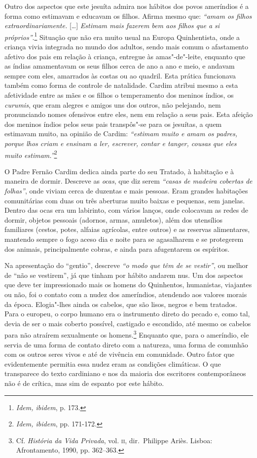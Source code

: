 Outro dos aspectos que este jesuíta admira nos hábitos dos povos
ameríndios é a forma como estimavam e educavam os filhos. Afirma mesmo
que: \textit{``amam os filhos extraordinariamente.} [\ldots] \textit{Estimam
mais fazerem bem aos filhos que a si próprios''}.\footnote{ \textit{Idem, ibidem}, 
p. 173.} Situação que não era muito usual na
Europa Quinhentista, onde a criança vivia integrada no mundo dos
adultos, sendo mais comum o afastamento afetivo dos pais em relação à
criança, entregue às amas"-de"-leite, enquanto que as índias amamentavam
os seus filhos cerca de ano a ano e meio, e andavam sempre com eles,
amarrados às costas ou ao quadril. Esta prática funcionava também como
forma de controle de natalidade. Cardim atribui mesmo a esta
afetividade entre as mães e os filhos o temperamento dos meninos
índios, os \textit{curumis}, que eram alegres e amigos uns dos outros,
não pelejando, nem pronunciando nomes ofensivos entre eles, nem em
relação a seus pais. Esta afeição dos meninos índios pelos seus pais
transpôs"-se para os jesuítas, a quem estimavam muito, na opinião de
Cardim: \textit{``estimam muito e amam os padres, porque lhos
criam e ensinam a ler, escrever, contar e tanger, cousas que eles muito
estimam.''}\footnote{ \textit{Idem, ibidem}, pp. 171-172.} 

 O Padre Fernão Cardim dedica ainda parte do seu Tratado, 
à habitação e à maneira de dormir. Descreve as \textit{ocas}, que diz
serem \textit{``casas de madeira cobertas de folhas''}, onde
viviam cerca de duzentas e mais pessoas. Eram grandes habitações
comunitárias com duas ou três aberturas muito baixas e pequenas, sem
janelas. Dentro das ocas era um labirinto, com vários lanços, 
onde colocavam as redes de dormir, objetos pessoais (adornos, armas, amuletos), além dos
utensílios familiares (cestos, potes, alfaias agrícolas, entre outros)
e as reservas alimentares, mantendo sempre o fogo aceso dia e noite
para se agasalharem e se protegerem dos animais, principalmente cobras,
e ainda para afugentarem os espíritos. 

 Na apresentação do ``gentio'', descreve \textit{``o modo
que têm de se vestir''}, ou melhor de ``não se vestirem'', já que
tinham por hábito andarem nus. Um dos aspectos que deve ter
impressionado mais os homens do Quinhentos, humanistas, viajantes ou
não, foi o contato com a nudez dos ameríndios, atendendo aos valores
morais da época. Elogia"-lhes ainda os cabelos, que são lisos, negros e
bem tratados. Para o europeu, o corpo humano era o instrumento direto
do pecado e, como tal, devia de ser o mais coberto possível, castigado
e escondido, até mesmo os cabelos para não atraírem sexualmente os
homens.\footnote{ Cf. \textit{História da Vida Privada}, vol. \textsc{ii},
dir.~Philippe Ariès. Lisboa: Afrontamento, 
1990, pp. 362--363.} Enquanto que, para o ameríndio, ele servia de uma forma de
contato direto com a natureza, uma forma de comunhão com os outros
seres vivos e até de vivência em comunidade. Outro fator que
evidentemente permitia essa nudez eram as condições climáticas. O que
transparece do texto cardiniano e nos da maioria dos escritores
contemporâneos não é de crítica, mas sim de espanto por este hábito.

